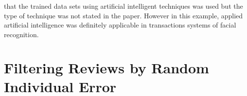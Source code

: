 \documentclass[12pt]{article} %
\begin{document}
that the trained data sets using artificial intelligent techniques was used but the type of technique was not stated in the paper. However in this example, applied artificial intelligence was definitely applicable in transactions systems of facial recognition.

\newpage


\section{Filtering Reviews by Random Individual Error} %
\end{document}
